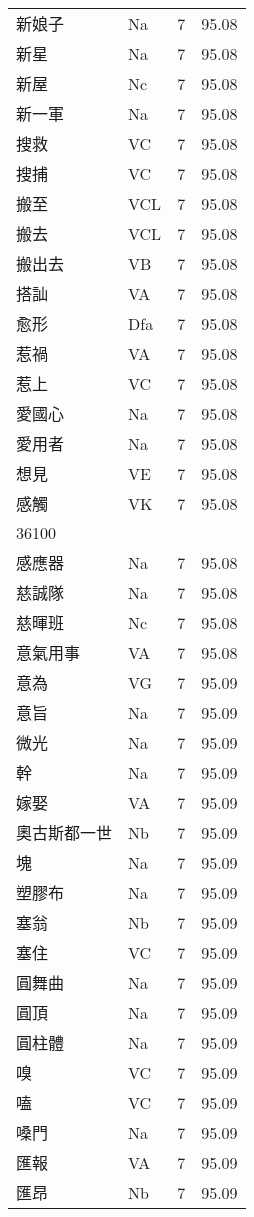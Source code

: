 \documentclass[twocolumn]{book}
\begin{document}
\begin{supertabular}{llrr}
新娘子 & Na & 7 &  95.08\\
新星 & Na & 7 &  95.08\\
新屋 & Nc & 7 &  95.08\\
新一軍 & Na & 7 &  95.08\\
搜救 & VC & 7 &  95.08\\
搜捕 & VC & 7 &  95.08\\
搬至 & VCL & 7 &  95.08\\
搬去 & VCL & 7 &  95.08\\
搬出去 & VB & 7 &  95.08\\
搭訕 & VA & 7 &  95.08\\
愈形 & Dfa & 7 &  95.08\\
惹禍 & VA & 7 &  95.08\\
惹上 & VC & 7 &  95.08\\
愛國心 & Na & 7 &  95.08\\
愛用者 & Na & 7 &  95.08\\
想見 & VE & 7 &  95.08\\
感觸 & VK & 7 &  95.08\\
36100\\
感應器 & Na & 7 &  95.08\\
慈誠隊 & Na & 7 &  95.08\\
慈暉班 & Nc & 7 &  95.08\\
意氣用事 & VA & 7 &  95.08\\
意為 & VG & 7 &  95.09\\
意旨 & Na & 7 &  95.09\\
微光 & Na & 7 &  95.09\\
幹 & Na & 7 &  95.09\\
嫁娶 & VA & 7 &  95.09\\
奧古斯都一世 & Nb & 7 &  95.09\\
塊 & Na & 7 &  95.09\\
塑膠布 & Na & 7 &  95.09\\
塞翁 & Nb & 7 &  95.09\\
塞住 & VC & 7 &  95.09\\
圓舞曲 & Na & 7 &  95.09\\
圓頂 & Na & 7 &  95.09\\
圓柱體 & Na & 7 &  95.09\\
嗅 & VC & 7 &  95.09\\
嗑 & VC & 7 &  95.09\\
嗓門 & Na & 7 &  95.09\\
匯報 & VA & 7 &  95.09\\
匯昂 & Nb & 7 &  95.09\\

\end{supertabular}
\end{document}
